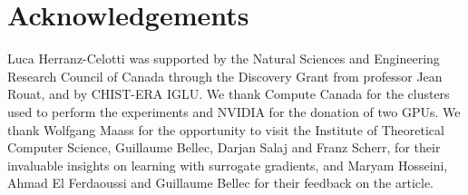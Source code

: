 \section{Acknowledgements}

Luca Herranz-Celotti was supported by the Natural Sciences and Engineering Research Council of Canada through the Discovery Grant from professor Jean Rouat, and by CHIST-ERA IGLU. We thank Compute Canada for the clusters used to perform the experiments and NVIDIA for the donation of two GPUs. We thank Wolfgang Maass for the opportunity to visit the Institute of Theoretical Computer Science, Guillaume Bellec, Darjan Salaj and Franz Scherr, for their invaluable insights on learning with surrogate gradients, and Maryam Hosseini, Ahmad El Ferdaoussi and Guillaume Bellec for their feedback on the article.